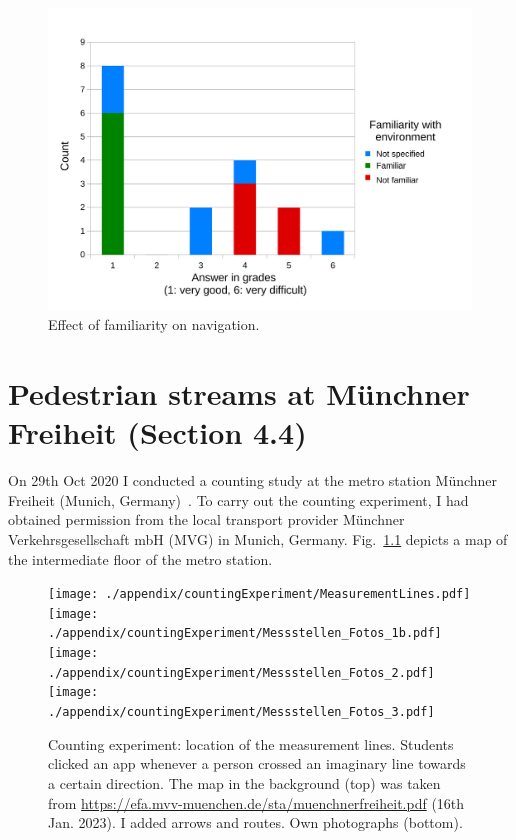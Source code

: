 \begin{figure}[hbt!]
\centering
\includegraphics[width=12cm]{../figures/appendix/resultsonsite.pdf} 
\caption[Effect of familiarity on navigation]{Effect of familiarity on navigation. }
\label{fig:familair}
\end{figure}





\chapter{Pedestrian streams at Münchner Freiheit (Section 4.4)}
\label{sec:countstudy}

On 29th Oct 2020 I conducted a counting study at the metro station Münchner Freiheit (Munich, Germany)~\cite{mayr-2024-cdyn}.
To carry out the counting experiment, I had obtained permission from the local transport provider Münchner Verkehrsgesellschaft mbH (MVG) in Munich, Germany.  Fig.~\ref{fig:intermediatefloormucfreiheit} depicts a map of the intermediate floor of the metro station.  





\begin{figure}[H]
\texttt{[image: ./appendix/countingExperiment/MeasurementLines.pdf]} 
\texttt{[image: ./appendix/countingExperiment/Messstellen\_Fotos\_1b.pdf]} 
\texttt{[image: ./appendix/countingExperiment/Messstellen\_Fotos\_2.pdf]} 
\texttt{[image: ./appendix/countingExperiment/Messstellen\_Fotos\_3.pdf]} 
\caption[Counting experiment: location of the measurement lines.]{Counting experiment: location of the measurement lines. Students clicked an app whenever a person crossed an imaginary line towards a certain direction. The map in the background (top) was taken from \url{https://efa.mvv-muenchen.de/sta/muenchnerfreiheit.pdf} (16th Jan. 2023). I added arrows and routes. Own photographs (bottom). }
\label{fig:intermediatefloormucfreiheit}
\end{figure}


